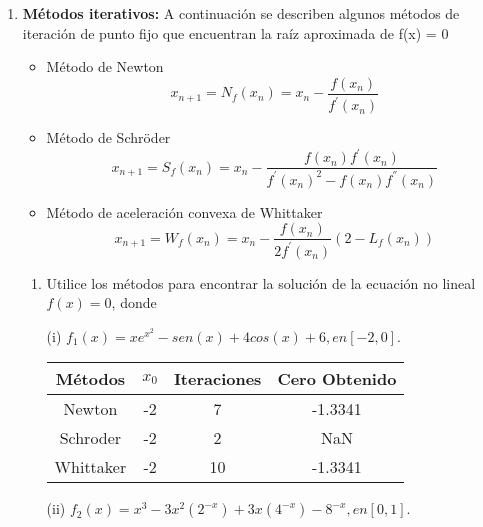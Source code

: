 \documentclass{udpreport}
\begin{document}
\begin{enumerate}
\begin{enumerate}
\end{enumerate}
\newpage

\item {\bf Métodos iterativos:} A continuación se describen algunos métodos de iteración de punto fijo que encuentran la raíz aproximada de f(x) = 0
\begin{itemize}
        \item Método de Newton     
            \begin{equation*}
                 x_{n+1}=N_f(x_n)=x_n -  \frac{f(x_n)}{f^{'}(x_n)}
            \end{equation*}
        
        \item Método de Schröder
            \begin{equation*}
                x_{n+1}=S_f(x_n)=x_n-\frac{f(x_n)f^{'}(x_n)}{f^{'}(x_n)^{2}-f(x_n)f^{''}(x_n)}
            \end{equation*}
        
        \item Método de aceleración convexa de Whittaker
            \begin{equation*}
                x_{n+1}=W_f(x_n)=x_n - \frac{f(x_n)}{2f^{'}(x_n)}(2 - L_f(x_n))
            \end{equation*}
        
\end{itemize}
	\begin{enumerate}
	
		\item Utilice los métodos para encontrar la solución de la ecuación no lineal $f(x)=0$, donde
		
		(i) $f_{1}(x)=xe^{x^2}-sen(x)+4cos(x)+6, en [-2,0].$
		
		\begin{table}[H]
			\centering
			\begin{tabular}{|c|c|c|c|}
				\hline
				Métodos & $x_{0}$ & Iteraciones & Cero Obtenido \\
				\hline
				Newton & -2 &  7 & -1.3341\\
				\hline
				Schroder & -2 & 2 & NaN \\
				\hline
				Whittaker & -2 & 10 & -1.3341 \\
				\hline				
			\end{tabular}
			\end{table}	
		
		
		
		(ii) $f_{2}(x)=x^3-3x^2(2^{-x})+3x(4^{-x})-8^{-x}, en [0,1].$
		

\end{enumerate}
\end{enumerate}
\end{document}
